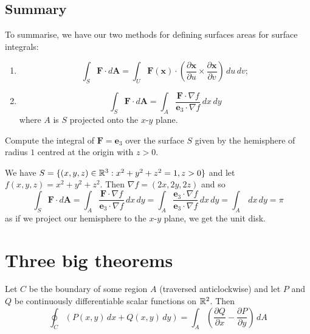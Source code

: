 
\section{Summary}

To summarise, we have our two methods for defining surfaces areas for
surface integrals:
\begin{enumerate}
    \item 
        \[
            \int_S \bm F \cdot d \bm A 
            = \int_U \bm F(\bm x) \cdot
            \left(
                \frac{\partial \bm x}{\partial u} 
                \times \frac{\partial \bm x}{\partial v}
            \right)
            \,du\,dv;
        \]

    \item
        \[
            \int_S \bm F \cdot d\bm A
            = \int_A \frac{\bm F \cdot \nabla f}{\bm e_3 \cdot \nabla f} \,dx\,dy
        \]
        where $A$ is $S$ projected onto the $x$-$y$ plane.
\end{enumerate}

\begin{example}
    Compute the integral of $\bm F = \bm e_3$ over the surface $S$
    given by the hemisphere of radius $1$ centred at the origin with $z > 0$.
\end{example}

\begin{solution}
    We have $S = \{(x,y,z) \in \mathbb{R}^3: x^2 + y^2 + z^2 = 1, z > 0\}$
    and let $f(x,y,z) = x^2 + y^2 + z^2$.
    Then $\nabla f = (2x,2y,2z)$ and so
    \[
        \int_S \bm F \cdot d\bm A
        = \int_A \frac{\bm F \cdot \nabla f}{\bm e_3 \cdot \nabla f} \,dx\,dy
        = \int_A \frac{\bm e_3 \cdot \nabla f}{\bm e_3 \cdot \nabla f} \,dx\,dy
        = \int_A \,dx\,dy = \pi
    \]
    as if we project our hemisphere to the $x$-$y$ plane, we get the unit disk.
\end{solution}

\chapter{Three big theorems}

\begin{theorem}
    Let $C$ be the boundary of some region $A$ (traversed anticlockwise) and let
    $P$ and $Q$ be continuously differentiable scalar functions on $\mathbb{R}^2$.
    Then
    \[
        \oint_C \left(P(x, y)\,dx + Q(x,y)\,dy\right)
        = \int_A 
        \left(
            \frac{\partial Q}{\partial x} - \frac{\partial P}{\partial y}
        \right)
        \,dA
    \]
\end{theorem}

